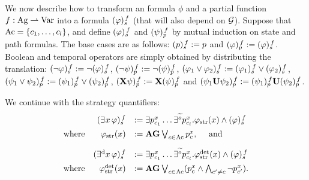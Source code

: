 \halfline
{}
 We now describe how to transform an \SLref formula $\phi$ and a partial
function $f:\Agf \partialto  \Varf$ into a \QCTLs
formula $\tr[f]{\phi}$ (that will also depend on $\CGS$).
Suppose that $\Mov=\{\mov_{1},\ldots,\mov_{\maxmov}\}$, and define
$\tr[f]{\phi}$ and $\trp[f]{\psi}$ by mutual induction on state and path formulas. 
The base cases are as follows:
$\tr[f]{p} 		 \egdef p$ and $\trp[f]{\phi} \egdef
\tr[f]{\phi}$. Boolean and temporal operators are simply obtained by
distributing the translation:
$\tr[f]{\neg \phi} 	 \egdef \neg \tr[f]{\phi}$, $\trp[f]{\neg
  \psi} \egdef \neg \trp[f]{\psi}$,
$\tr[f]{\phi_1\ou\phi_2}  \egdef \tr[f]{\phi_1}\ou\tr[f]{\phi_2}$,
$\trp[f]{\psi_1\ou\psi_2}  \egdef \trp[f]{\psi_1}\ou\trp[f]{\psi_2}$,
$\trp[f]{\X\psi}  \egdef \X\trp[f]{\psi}$ and $\trp[f]{\psi_1\until\psi_2}  \egdef \trp[f]{\psi_1}\until\trp[f]{\psi_2}$.


We continue with the strategy quantifiers:
\[
  \begin{array}{lrl}
& \tr[f]{\Estratnd\phi}	& \egdef  \exists
                                  p_{\mov_{1}}^{\var}\ldots
                                  \exists^{\trobs{\obs}}
                                  p_{\mov_{\maxmov}}^{\var}. \phistrat
                                  \et \tr[f]{\phi}\\[5pt]
  \mbox{where} &  \phistrat & \egdef \A\always
                              \bigou_{\mov\in\Mov}p_{\mov}^{\var},
                              \quad\mbox{ and}\\[10pt]
& \tr[f]{\Estratd\phi}	& \egdef  \exists
                                  p_{\mov_{1}}^{\var}\ldots
                                  \exists^{\trobs{\obs}}
                                  p_{\mov_{\maxmov}}^{\var}. \phistratdet
                                  \et \tr[f]{\phi}\\[5pt]
  \mbox{where} & \phistratdet & \egdef
\A\always\bigou_{\mov\in\Mov}(p_{\mov}^{\var}\et\biget_{\mov'\neq\mov}\neg
p_{\mov'}^{\var}).                              
\end{array}
\]

